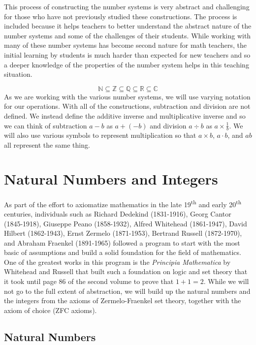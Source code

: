 \documentclass[
]{book}
\theoremstyle{definition}
\theoremstyle{definition}
\theoremstyle{definition}
\theoremstyle{definition}
\theoremstyle{remark}
\begin{document}
This process of constructing the number systems is very abstract and challenging for those who have not previously studied these constructions. The process is included because it helps teachers to better understand the abstract nature of the number systems and some of the challenges of their students. While working with many of these number systems has become second nature for math teachers, the initial learning by students is much harder than expected for new teachers and so a deeper knowledge of the properties of the number system helps in this teaching situation.

\[\mathbb{N} \subseteq \mathbb{Z} \subseteq \mathbb{Q} \subseteq \mathbb{R} \subseteq \mathbb{C}\]
As we are working with the various number systems, we will use varying notation for our operations. With all of the constructions, subtraction and division are not defined. We instead define the additive inverse and multiplicative inverse and so we can think of subtraction \(a-b\) as \(a+(-b)\) and division \(a\div b\) as \(a \times \frac{1}{b}\). We will also use various symbols to represent multiplication so that \(a\times b\), \(a\cdot b\), and \(ab\) all represent the same thing.

\hypertarget{Integers}{%
\section{Natural Numbers and Integers}\label{Integers}}

As part of the effort to axiomatize mathematics in the late 19\textsuperscript{th} and early 20\textsuperscript{th} centuries, individuals such as Richard Dedekind (1831-1916), Georg Cantor (1845-1918), Giuseppe Peano (1858-1932), Alfred Whitehead (1861-1947), David Hilbert (1862-1943), Ernst Zermelo (1871-1953), Bertrand Russell (1872-1970), and Abraham Fraenkel (1891-1965) followed a program to start with the most basic of assumptions and build a solid foundation for the field of mathematics. One of the greatest works in this program is the \emph{Principia Mathematica} by Whitehead and Russell \citetext{\citeyear{Principia1}; \citeyear{Principia2}; \citeyear{Principia3}} that built such a foundation on logic and set theory that it took until page 86 of the second volume to prove that \(1+1=2\). While we will not go to the full extent of abstraction, we will build up the natural numbers and the integers from the axioms of Zermelo-Fraenkel set theory, together with the axiom of choice (ZFC axioms).

\hypertarget{natural-numbers}{%
\subsection{Natural Numbers}\label{natural-numbers}}
\end{document}
